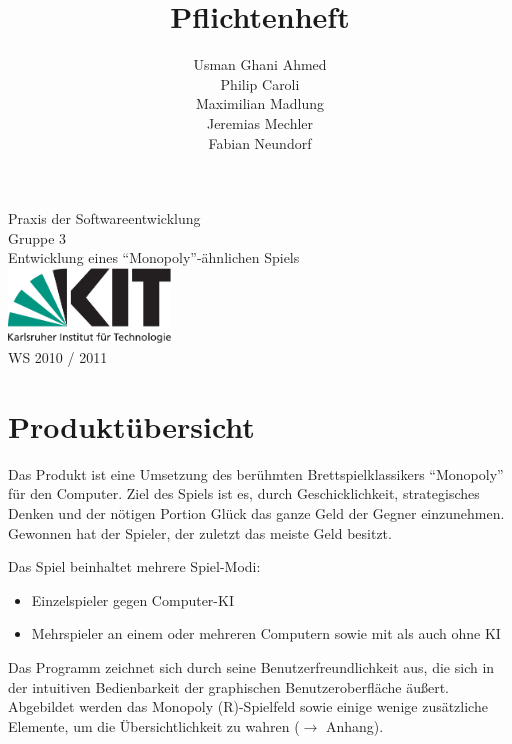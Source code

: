 \documentclass[a4paper,10pt]{article}
\title{Pflichtenheft}
\date{}
\author{Usman Ghani Ahmed \\
Philip Caroli\\
Maximilian Madlung\\ 
Jeremias Mechler\\ 
Fabian Neundorf}
\begin{document}
\maketitle
\begin{center}
\huge{Praxis der Softwareentwicklung \\
Gruppe 3 \\[0.5cm]
Entwicklung eines ``Monopoly''-ähnlichen Spiels \\[0.5cm]
\includegraphics[height=2cm]{kitlogo_de_rgb}  \\[0.5cm]
WS 2010 / 2011} \\[2cm]
\end{center}

\newpage

\tableofcontents

\newpage

\section{Produktübersicht}
Das Produkt ist eine Umsetzung des berühmten Brettspielklassikers ``Monopoly'' für den Computer.
Ziel des Spiels ist es, durch Geschicklichkeit, strategisches Denken und der nötigen Portion Glück das ganze Geld der Gegner einzunehmen. Gewonnen hat der Spieler, der zuletzt das meiste Geld besitzt. 

Das Spiel beinhaltet mehrere Spiel-Modi:
\begin{itemize}
\item Einzelspieler gegen Computer-KI
\item Mehrspieler an einem oder mehreren Computern sowie mit als auch ohne KI
\end{itemize}
Das Programm zeichnet sich durch seine Benutzerfreundlichkeit aus, die sich in der intuitiven Bedienbarkeit der graphischen Benutzeroberfläche äußert. Abgebildet werden das Monopoly (R)-Spielfeld sowie einige wenige zusätzliche Elemente, um die Übersichtlichkeit zu wahren ($\rightarrow$ Anhang). 
\end{document}
